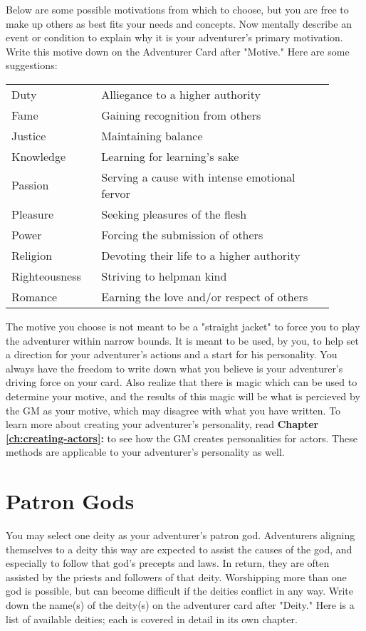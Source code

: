 \begin{multicols*}{2}
Below are some possible motivations from which to choose, but you are free to make up others as best fits your needs and concepts. Now mentally describe an event or condition to explain why it is your adventurer's primary motivation. Write this motive down on the Adventurer Card after "Motive." Here are some suggestions:
\begin{tcolorbox}[breakable,boxrule=0pt,before skip=5pt,title=\textbf{Hair Color}]
\begin{tabular}{@{}p{0.25\linewidth} p{0.65\linewidth}}
Duty & Alliegance to a higher authority\\
Fame & Gaining recognition from others\\
Justice & Maintaining balance\\
Knowledge & Learning for learning's sake\\
Passion & Serving a cause with intense emotional fervor\\
Pleasure & Seeking pleasures of the flesh\\
Power & Forcing the submission of others\\
Religion & Devoting their life to a higher authority\\
Righteousness & Striving to helpman kind\\
Romance & Earning the love and/or respect of others
\end{tabular}
\end{tcolorbox}
The motive you choose is not meant to be a "straight jacket" to force you to play the adventurer within narrow bounds. It is meant to be used, by you, to help set a direction for your adventurer's actions and a start for his personality. You always have the freedom to write down what you believe is your adventurer's driving force on your card. Also realize that there is magic which can be used to determine your motive, and the results of this magic will be what is percieved by the GM as your motive, which may disagree with what you have written.
To learn more about creating your adventurer's personality, read \textbf{Chapter \ref{ch:creating-actors}: } to see how the GM creates personalities for actors. These methods are applicable to your adventurer's personality as well.
\section{Patron Gods}
You may select one deity as your adventurer's patron god. Adventurers aligning themselves to a deity this way are expected to assist the causes of the god, and especially to follow that god's precepts and laws. In return, they are often assisted by the priests and followers of that deity. Worshipping more than one god is possible, but can become difficult if the deities conflict in any way. Write down the name(s) of the deity(s) on the adventurer card after "Deity." Here is a list of available deities; each is covered in detail in its own chapter.


\end{multicols*}
